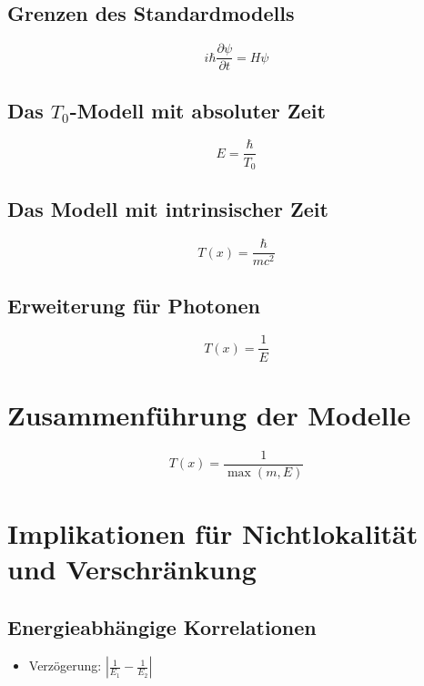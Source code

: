 \documentclass[12pt,a4paper]{article}
\newcommand{\Tfield}{T(x)}
\begin{document}
	\subsection{Grenzen des Standardmodells}
	\begin{equation}
		i\hbar\frac{\partial\psi}{\partial t} = H\psi
	\end{equation}
	
	\subsection{Das $T_0$-Modell mit absoluter Zeit}
	\begin{equation}
		E = \frac{\hbar}{T_0}
	\end{equation}
	
	\subsection{Das Modell mit intrinsischer Zeit}
	\begin{equation}
		\Tfield = \frac{\hbar}{mc^2}
	\end{equation}
	
	\subsection{Erweiterung für Photonen}
	\begin{equation}
		\Tfield = \frac{1}{E}
	\end{equation}
	
	\section{Zusammenführung der Modelle}
	\begin{equation}
		\Tfield = \frac{1}{\max(m, E)}
	\end{equation}
	
	\section{Implikationen für Nichtlokalität und Verschränkung}
	\subsection{Energieabhängige Korrelationen}
	\begin{itemize}
		\item Verzögerung: \(\left|\frac{1}{E_1} - \frac{1}{E_2}\right|\)
	\end{itemize}
	
\end{document}
